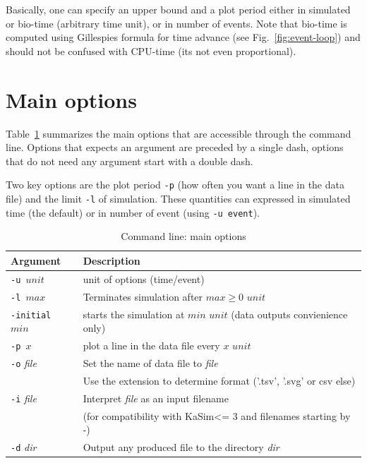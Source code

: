 \documentclass[11pt]{book}
\def\KaSim{\textsf{KaSim}}
\def\ttt#1{\texttt{#1}}
\begin{document}
Basically, one can specify an upper bound and a plot period either in
simulated or bio-time (arbitrary time unit), or in number of
events. Note that bio-time is computed using
Gillespie{\textquotesingle}s formula for time advance (see
Fig.~\ref{fig:event-loop}) and should not be confused with CPU-time
(it{\textquotesingle}s not even proportional).

\section{Main options}

Table~\ref{tab:options} summarizes the main options that are
accessible through the command line. Options that expects an argument
are preceded by a single dash, options that do not need any argument
start with a double dash.

Two key options are the plot period \ttt{-p} (how often you want a
line in the data file) and the limit \ttt{-l} of simulation. These
quantities can expressed in simulated time (the default) or in number
of event (using \ttt{-u event}).

\begin{table}[h!]
\caption{Command line: main options}
\centering
\begin{tabular}{|l|l|}
\hline
Argument & Description \\ \hline
\ttt{-u $unit$} & unit of options (time/event)\\
\ttt{-l $max$} & Terminates simulation after $max \geq 0$ $unit$\\
\ttt{-initial $min$} & starts the simulation at $min$ $unit$ (data outputs convienience only)\\
\ttt{-p $x$} & plot a line in the data file every $x$ $unit$\\
\ttt{-o} \textit{file} & Set the name of data file to \textit{file}\\
&Use the extension to determine format ('.tsv', '.svg' or csv else)\\
\ttt{-i} \textit{file} & Interpret \textit{file} as an input filename\\
& (for compatibility with \KaSim <= 3 and filenames starting by -)\\
\ttt{-d} \textit{dir} & Output any produced file to the directory \textit{dir}\\
\hline
\end{tabular}
\label{tab:options}
\end{table}%
\end{document}
